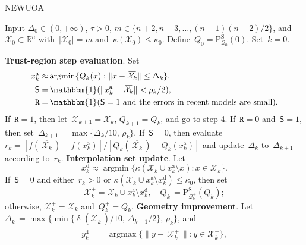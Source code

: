 \documentclass[11pt,a4paper,draft]{article}  %
\theoremstyle{definition}
\numberwithin{equation}{section}
\newcommand{\mbar}[1]{\,\overline{\!{#1}\!}\,} %
\newcommand{\xopt}{\mbar}
\DeclareMathOperator{\xdist}{\updelta}
\DeclareMathOperator*{\argmax}{argmax}
\DeclareMathOperator*{\argmin}{argmin}
\DeclareMathOperator{\ind}{\mathbbm{1}}
\newcommand{\shortd}{\mathsf{S}}
\newcommand{\redrho}{\mathtt{R}}
\newcommand{\RR}{\mathbb{R}}
\newcommand{\Int}{\mathcal{X}}
\newcommand{\Qua}{\mathcal{Q}}
\newcommand{\sss}[1]{{\scriptscriptstyle{#1}}}
\newcommand{\add}{{\textrm{a}}}
\newcommand{\drop}{{\textrm{d}}}
\newcommand{\new}{{\sss{+}}}
\newcommand{\sob}{{\scriptscriptstyle{\textrm{S}}}}
\newcommand{\Projs}{\mathrm{P}^\sob}
\begin{document}
\begin{algorithm}[htbp!]
    \caption{\label{alg:newuoa}NEWUOA}
    Input $\Delta_0\in (0,+\infty)$, $\tau>0$, $m\in \{n+2, n+3, \dots, (n+1)(n+2)/2\}$,
    and~$\Int_0\subset \RR^n$ with~$|\Int_0|=m$ and~$\kappa(\Int_0) \le \kappa_0$.
    Define~$Q_0 = \Projs_{\Qua_0}(0)$.
    Set~$k=0$.
    \begin{algorithmic}[1]
        \State \textbf{Trust-region step evaluation}.
        Set
        \begin{align}
             \label{eq:xaddn}
             x_k^\add \approx &\argmin\{Q_k(x)\mathrel{:} \|x-\xopt{\Int_k}\|\le \Delta_k\}.\\
            \label{eq:shortd}
            \shortd = &\ind(\|x_k^\add-\xopt{\Int_k}\| < \rho_k/2),\\
            \label{eq:redrho}
            \redrho = & \ind(\shortd=1\text{ and the errors in recent models are small}).
        \end{align}
        If~$\redrho = 1$, then let~$\Int_{k+1} = \Int_k$, $Q_{k+1} = Q_k$, and go to step 4.
        If~$\redrho = 0$ and~$\shortd = 1$, then set~$\Delta_{k+1} = \max\{\Delta_k/10,\, \rho_k\}$.
        If~$\shortd = 0$, then evaluate $r_k = [f(\xopt{\Int_k})-f(x_k^\add)]/[Q_k(\xopt{\Int_k})-Q_k(x_k^\add)]$ and update~$\Delta_k$ to~$\Delta_{k+1}$ according to~$r_k$.
        \State \textbf{Interpolation set update}.
        Let
        \begin{equation}
            \label{eq:xdropn}
            x_k^\drop \approx \argmin\{\kappa(\Int_k\cup x_k^\add\setminus x) \mathrel{:} x \in
            \Int_k\}.
        \end{equation}
        If~$\shortd = 0$ and either~$r_k>0$ or $\kappa(\Int_k\cup x_k^\add \setminus x_k^\drop) \le
        \kappa_0$, then set
        \begin{equation}
            \label{eq:updateq1}
            \Int^{\new}_{k} = \Int_k\cup x_k^\add\setminus x_k^\drop, \quad
            {Q}^{\new}_k = \Projs_{\Qua_k^\new}(Q_k);
        \end{equation}
        otherwise, $\Int_k^\new = \Int_k$ and~$Q_k^\new =Q_k$.
        \State \textbf{Geometry improvement}.
        Let~$\Delta^{\new}_k = \max\{\min\{\xdist(\Int_k^\new)/10,\, \Delta_{k+1}/2\},\,\rho_{k}\}$,
        and
          \begin{align}
              \label{eq:ydropn}
              y_k^\drop &= \argmax\{\|y-\xopt{\Int^{\new}_k}\| \mathrel{:} y \in \Int^{\new}_k\},\\

\end{align}
\end{algorithmic}
\end{algorithm}
\end{document}

